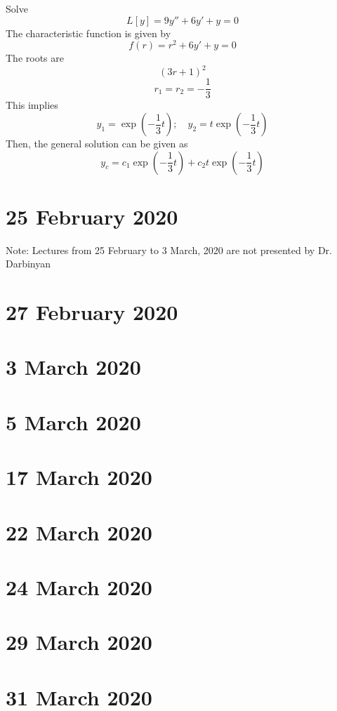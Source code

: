 \documentclass[twoside]{report}
\begin{document}
    \np
    \begin{example}
        Solve
        \begin{equation}
            L[y] = 9y'' + 6y' + y = 0
        \end{equation}
        The characteristic function is given by
        \begin{equation}
            f(r) = r^{2} + 6y' + y = 0
        \end{equation}
        The roots are
        \begin{equation}
            (3r + 1)^{2}
        \end{equation}
        \begin{equation}
            r_{1} = r_{2} = -\frac{1}{3}
        \end{equation}
        This implies
        \begin{equation}
            y_{1} = \exp(-\frac{1}{3}t);\quad y_{2} = t\exp(-\frac{1}{3}t)
        \end{equation}
        Then, the general solution can be given as
        \begin{equation}
            y_{c} = c_{1}\exp(-\frac{1}{3}t) + c_{2}t\exp(-\frac{1}{3}t)
        \end{equation}
    \end{example}
    \chapter{25 February 2020}
    Note: Lectures from 25 February to 3 March, 2020 are not presented by Dr. Darbinyan
    \chapter{27 February 2020}
    \chapter{3 March 2020}
    \chapter{5 March 2020}
    \chapter{17 March 2020}
    \chapter{22 March 2020}
    \chapter{24 March 2020}
    \chapter{29 March 2020}
    \chapter{31 March 2020}
\end{document}
